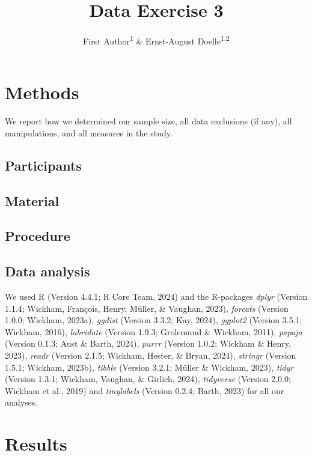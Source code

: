 \documentclass[
  man]{apa6}
\title{Data Exercise 3}
\author{First Author\textsuperscript{1} \& Ernst-August Doelle\textsuperscript{1,2}}
\date{}
\affiliation{\vspace{0.5cm}\textsuperscript{1} Wilhelm-Wundt-University\\\textsuperscript{2} Konstanz Business School}
\begin{document}
\maketitle

\section{Methods}\label{methods}

We report how we determined our sample size, all data exclusions (if any), all manipulations, and all measures in the study.

\subsection{Participants}\label{participants}

\subsection{Material}\label{material}

\subsection{Procedure}\label{procedure}

\subsection{Data analysis}\label{data-analysis}

We used R (Version 4.4.1; R Core Team, 2024) and the R-packages \emph{dplyr} (Version 1.1.4; Wickham, François, Henry, Müller, \& Vaughan, 2023), \emph{forcats} (Version 1.0.0; Wickham, 2023a), \emph{ggdist} (Version 3.3.2; Kay, 2024), \emph{ggplot2} (Version 3.5.1; Wickham, 2016), \emph{lubridate} (Version 1.9.3; Grolemund \& Wickham, 2011), \emph{papaja} (Version 0.1.3; Aust \& Barth, 2024), \emph{purrr} (Version 1.0.2; Wickham \& Henry, 2023), \emph{readr} (Version 2.1.5; Wickham, Hester, \& Bryan, 2024), \emph{stringr} (Version 1.5.1; Wickham, 2023b), \emph{tibble} (Version 3.2.1; Müller \& Wickham, 2023), \emph{tidyr} (Version 1.3.1; Wickham, Vaughan, \& Girlich, 2024), \emph{tidyverse} (Version 2.0.0; Wickham et al., 2019) and \emph{tinylabels} (Version 0.2.4; Barth, 2023) for all our analyses.

\section{Results}\label{results}
\end{document}
